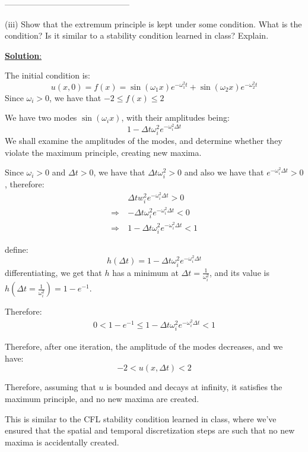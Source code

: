 \documentclass{article}
\begin{document}
 ---------------------------------------------

(iii) Show that the extremum principle is kept under some condition. What is the condition? Is it similar to a stability condition learned in class? Explain.

\ul{\textbf{Solution}:}

The initial condition is:
\[
  u(x,0) = f(x) = \sin(\omega_1 x) e^{-\omega_1 ^2 t} + \sin(\omega_2 x) e^{-\omega_2 ^2 t}  
\]
Since $\omega_i > 0$, we have that  $-2 \leq f(x) \leq 2$

We have two modes $\sin(\omega_i x)$, with their amplitudes being:
\[
  1-\Delta t \omega_i ^2 e^{- \omega_i ^2 \Delta t} 
\]
We shall examine the amplitudes of the modes, and determine whether they violate the maximum principle, creating new maxima. 


Since $\omega_i > 0$ and $\Delta t > 0$, we have that $\Delta t \omega_i ^2 > 0$ and also we have that $e^{-\omega_i ^2 \Delta t} > 0$, therefore:
\begin{align*}
  & \Delta t w_i ^2 e^{- \omega_i ^2 \Delta t} > 0 \\
\Rightarrow \ & - \Delta t \omega_i ^2 e^{- \omega_i ^2 \Delta t} < 0 \\
  \Rightarrow \ & 1 - \Delta t \omega_i ^2 e^{- \omega_i ^2 \Delta t} < 1
\end{align*}

define:
\[
  h(\Delta t) = 1- \Delta t \omega_i ^2 e^{-\omega_i ^2 \Delta t} 
\]
differentiating, we get that $h$ has a minimum at $\Delta t = \frac{1}{\omega_i ^2}$, and its value is $h(\Delta t = \frac{1}{\omega_i ^2}) = 1-e^{-1}$. 

Therefore:
\begin{align*}
0 < 1- e^{-1} \leq 1- \Delta t \omega_i ^2 e^{-\omega_i ^2 \Delta t}  < 1
\end{align*}


Therefore, after one iteration, the amplitude of the modes decreases, and we have:
\[
  -2 < u(x,\Delta t) < 2
\]

Therefore, assuming that $u$ is bounded and decays at infinity, it satisfies the maximum principle, and no new maxima are created.

This is similar to the CFL stability condition learned in class, where we've ensured that the spatial and temporal discretization steps are such that no new maxima is accidentally created.
\end{document}
